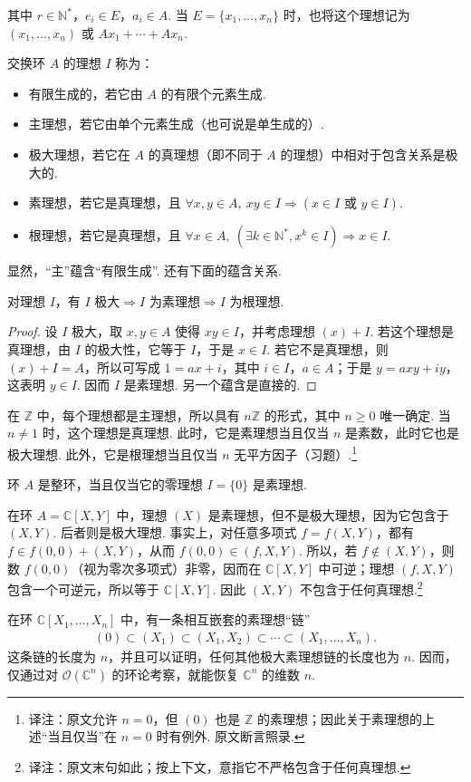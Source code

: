 其中 $r\in\mathbb N^*$，$e_i\in E$，$a_i\in A$. 当 $E=\{x_1,\ldots,x_n\}$ 时，也将这个理想记为 $(x_1,\ldots,x_n)$ 或 $Ax_1+\cdots+Ax_n$.
\begin{definition*}
交换环 $A$ 的理想 $I$ 称为：
\begin{itemize}
\item 有限生成的，若它由 $A$ 的有限个元素生成.
\item 主理想，若它由单个元素生成（也可说是单生成的）.
\item 极大理想，若它在 $A$ 的真理想（即不同于 $A$ 的理想）中相对于包含关系是极大的.
\item 素理想，若它是真理想，且 $\forall x,y\in A,\ xy\in I\Rightarrow(x\in I\text{ 或 }y\in I)$.
\item 根理想，若它是真理想，且 $\forall x\in A,\ (\exists k\in\mathbb N^*,x^k\in I)\Rightarrow x\in I$.
\end{itemize}
\end{definition*}
显然，``主''蕴含``有限生成''. 还有下面的蕴含关系.
\begin{lemma*}
对理想 $I$，有 $I\text{ 极大}\Rightarrow I\text{ 为素理想}\Rightarrow I\text{ 为根理想}$.
\end{lemma*}
\begin{proof}
设 $I$ 极大，取 $x,y\in A$ 使得 $xy\in I$，并考虑理想 $(x)+I$. 若这个理想是真理想，由 $I$ 的极大性，它等于 $I$，于是 $x\in I$. 若它不是真理想，则 $(x)+I=A$，所以可写成 $1=ax+i$，其中 $i\in I$，$a\in A$；于是 $y=axy+iy$，这表明 $y\in I$. 因而 $I$ 是素理想. 另一个蕴含是直接的.
\end{proof}
\begin{example*}
在 $\mathbb Z$ 中，每个理想都是主理想，所以具有 $n\mathbb Z$ 的形式，其中 $n\geqslant0$ 唯一确定. 当 $n\ne1$ 时，这个理想是真理想. 此时，它是素理想当且仅当 $n$ 是素数，此时它也是极大理想. 此外，它是根理想当且仅当 $n$ 无平方因子（习题）.\footnote{译注：原文允许 $n=0$，但 $(0)$ 也是 $\mathbb Z$ 的素理想；因此关于素理想的上述``当且仅当''在 $n=0$ 时有例外. 原文断言照录.}
\end{example*}
\begin{example*}
环 $A$ 是整环，当且仅当它的零理想 $I=\{0\}$ 是素理想.
\end{example*}
\begin{example*}
在环 $A=\mathbb C[X,Y]$ 中，理想 $(X)$ 是素理想，但不是极大理想，因为它包含于 $(X,Y)$. 后者则是极大理想. 事实上，对任意多项式 $f=f(X,Y)$，都有 $f\in f(0,0)+(X,Y)$，从而 $f(0,0)\in(f,X,Y)$. 所以，若 $f\notin(X,Y)$，则数 $f(0,0)$（视为零次多项式）非零，因而在 $\mathbb C[X,Y]$ 中可逆；理想 $(f,X,Y)$ 包含一个可逆元，所以等于 $\mathbb C[X,Y]$. 因此 $(X,Y)$ 不包含于任何真理想.\footnote{译注：原文末句如此；按上下文，意指它不严格包含于任何真理想.}
\end{example*}
\begin{remark*}
在环 $\mathbb C[X_1,\ldots,X_n]$ 中，有一条相互嵌套的素理想``链''
\begin{align*}
(0)\subset(X_1)\subset(X_1,X_2)\subset\cdots\subset(X_1,\ldots,X_n).
\end{align*}
这条链的长度为 $n$，并且可以证明，任何其他极大素理想链的长度也为 $n$. 因而，仅通过对 $\mathcal O(\mathbb C^n)$ 的环论考察，就能恢复 $\mathbb C^n$ 的维数 $n$.
\end{remark*}

